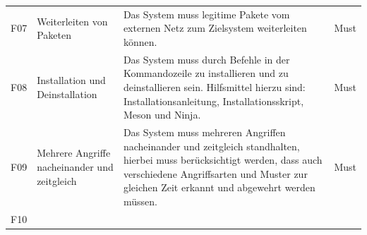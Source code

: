 \documentclass[../review_3.tex]{subfiles}
\begin{document}
\begin{longtable} [h] {p{1cm} p{4cm} p{7cm} l}
    F07                                                                                                                                                                                                              & Weiterleiten von Paketen                       & Das System muss legitime Pakete vom externen Netz zum Zielsystem weiterleiten können.                                                                                                                                                                   & Must            \\
    F08                                                                                                                                                                                                              & Installation und Deinstallation                & Das System muss durch Befehle in der Kommandozeile zu installieren und zu deinstallieren sein. Hilfsmittel hierzu sind: Installationsanleitung, Installationsskript, Meson und Ninja.                                                                   & Must            \\
    F09                                                                                                                                                                                                              & Mehrere Angriffe nacheinander und zeitgleich & Das System muss mehreren Angriffen nacheinander und zeitgleich standhalten, hierbei muss berücksichtigt werden, dass auch verschiedene Angriffsarten und Muster zur gleichen Zeit erkannt und abgewehrt werden müssen.                                  & Must            \\
    F10
    

\end{longtable}
\end{document}

